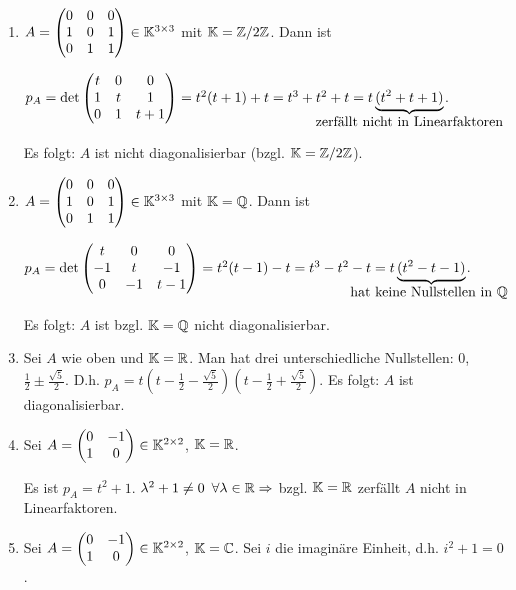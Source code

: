 \begin{bspe}\
	\begin{enumerate}
		\item
			$ A = \begin{pmatrix}
				0 & 0 & 0 \\
				1 & 0 & 1 \\
				0 & 1 & 1
			\end{pmatrix} \in \mathbb K^{3 \times 3} $ mit $ \mathbb K = \mathbb Z/2\mathbb Z $. Dann ist
			
			$ p_A = \det\begin{pmatrix}
				t & 0 & 0 \\
				1 & t & 1 \\
				0 & 1 & t+1
			\end{pmatrix} = t^2(t+1) + t = t^3 + t^2 + t = t \underbrace{(t^2 + t + 1)}_{\mathclap{\text{\normalsize zerfällt nicht in Linearfaktoren}}} $.
			
			Es folgt: $ A $ ist nicht diagonalisierbar (bzgl. $ \mathbb K = \mathbb Z/2\mathbb Z $).
		\item
			$ A = \begin{pmatrix}
				0 & 0 & 0 \\
				1 & 0 & 1 \\
				0 & 1 & 1
			\end{pmatrix} \in \mathbb K^{3 \times 3} $ mit $ \mathbb K = \mathbb Q $. Dann ist
			
			$ p_A = \det\begin{pmatrix}
				t & 0 & 0 \\
				-1 & t & -1 \\
				0 & -1 & t-1
			\end{pmatrix} = t^2(t-1) - t = t^3 - t^2 - t = t\underbrace{(t^2 - t - 1)}_{\mathclap{\text{\normalsize hat keine Nullstellen in $ \Q $ }}} $.
			
			Es folgt: $ A $ ist bzgl. $ \mathbb K = \mathbb Q $ nicht diagonalisierbar.
		\item
			Sei $ A $ wie oben und $ \mathbb K = \mathbb R $. Man hat drei unterschiedliche Nullstellen: 0, $ \frac{1}{2} \pm \frac{\sqrt{5}}{2} $. D.h. $ p_A = t(t - \frac{1}{2} - \frac{\sqrt{5}}{2})(t - \frac{1}{2} + \frac{\sqrt{5}}{2}) $. Es folgt: $ A $ ist diagonalisierbar.
		\item
			Sei $ A = \begin{pmatrix}
				0 & -1 \\
				1 & 0
			\end{pmatrix} \in \mathbb K^{2 \times 2} $, $ \mathbb K=\mathbb R $.
			
			Es ist $ p_A = t^2 + 1 $. $ \lambda^2 + 1 \neq 0 \enspace \forall \lambda \in \mathbb R \Rightarrow $ bzgl. $ \mathbb K = \mathbb R $ zerfällt $ A $ nicht in Linearfaktoren.
		\item
			Sei $ A = \begin{pmatrix}
				0 & -1 \\
				1 & 0
			\end{pmatrix} \in \mathbb K^{2 \times 2} $, $ \mathbb K=\mathbb C $. Sei $ i $ die imaginäre Einheit, d.h. $ i^2 + 1 = 0 $.
			

\end{enumerate}
\end{bspe}
